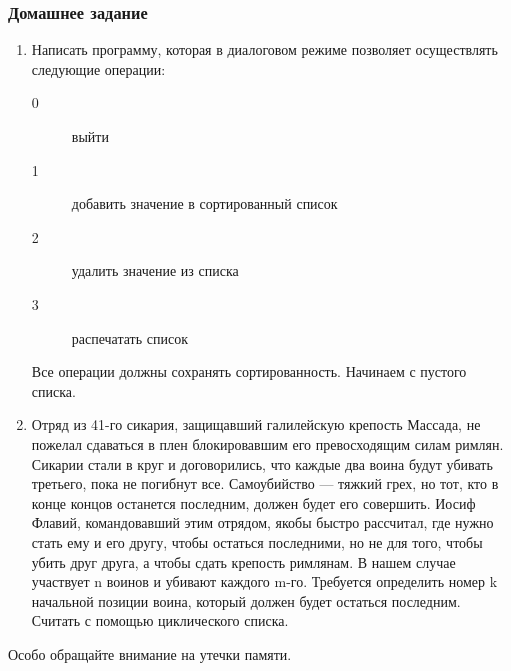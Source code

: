 \documentclass[aspectratio=169]{beamer}
\begin{document}
\begin{frame}
    \frametitle{Домашнее задание}

    \begin{footnotesize}
        \begin{enumerate}
            \item Написать программу, которая в диалоговом режиме позволяет осуществлять следующие операции:
                  \begin{description}
                      \item[0] выйти
                      \item[1] добавить значение в сортированный список
                      \item[2] удалить значение из списка
                      \item[3] распечатать список
                  \end{description}
                  Все операции должны сохранять сортированность.
                  Начинаем с пустого списка.
            \item Отряд из 41-го сикария, защищавший галилейскую крепость Массада, не пожелал сдаваться в плен блокировавшим его превосходящим силам римлян.
                  Сикарии стали в круг и договорились, что каждые два воина будут убивать третьего, пока не погибнут все.
                  Самоубийство — тяжкий грех, но тот, кто в конце концов останется последним, должен будет его совершить.
                  Иосиф Флавий, командовавший этим отрядом, якобы быстро рассчитал, где нужно стать ему и его другу, чтобы остаться последними, но не для того, чтобы убить друг друга, а чтобы сдать крепость римлянам.
                  В нашем случае участвует n воинов и убивают каждого m-го.
                  Требуется определить номер k начальной позиции воина, который должен будет остаться последним.
                  Считать с помощью циклического списка.
        \end{enumerate}

        Особо обращайте внимание на утечки памяти.
    \end{footnotesize}
\end{frame}
\end{document}
